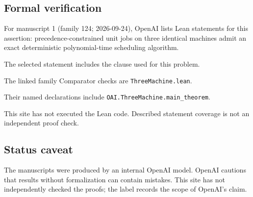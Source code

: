 \documentclass[11pt]{article}
\begin{document}
\subsection{Formal verification}
For manuscript 1 (family 124; 2026-09-24), OpenAI lists Lean statements for this assertion: precedence-constrained unit jobs on three identical machines admit an exact deterministic polynomial-time scheduling algorithm.

The selected statement includes the clause used for this problem.

The linked family Comparator checks are \texttt{ThreeMachine.lean}.

Their named declarations include \texttt{OAI.ThreeMachine.main\_theorem}.

This site has not executed the Lean code. Described statement coverage is not an independent proof check.

\subsection{Status caveat}
The manuscripts were produced by an internal OpenAI model. OpenAI cautions that results without formalization can contain mistakes. This site has not independently checked the proofs; the label records the scope of OpenAI's claim.
\end{document}

